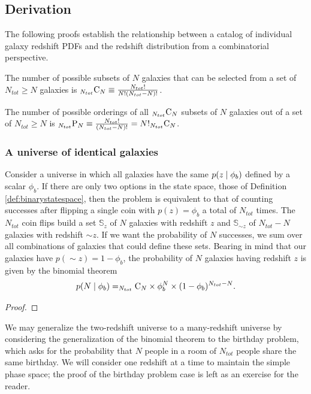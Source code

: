 \subsection{Derivation}
\label{sec:pedanticmath}

The following proofs establish the relationship between a catalog of individual galaxy redshift PDFs and the redshift distribution from a combinatorial perspective.
\begin{definition}
	 The number of possible subsets of $N$ galaxies that can be selected from a set of $N_{tot} \geq N$ galaxies is $_{N_{tot}}\mathrm{C}_{N} \equiv \frac{N_{tot}!}{N! (N_{tot} - N)!}$.
\end{definition}
\begin{definition}
	The number of possible orderings of all $_{N_{tot}}\mathrm{C}_{N}$ subsets of $N$ galaxies out of a set of $N_{tot} \geq N$ is $_{N_{tot}}\mathrm{P}_{N} \equiv \frac{N_{tot}!}{(N_{tot}-N)!} = N!_{N_{tot}}\mathrm{C}_{N}$.
\end{definition}

\subsubsection{A universe of identical galaxies}

\begin{theorem}
Consider a universe in which all galaxies have the same \pzpdf $p(z \mid \phi_{b})$ defined by a scalar $\phi_{b}$.
If there are only two options in the state space, those of Definition \ref{def:binarystatespace}, then the problem is equivalent to that of counting successes after flipping a single coin with $p(z) = \phi_{b}$ a total of $N_{tot}$ times.
The $N_{tot}$ coin flips build a set $\mathbb{S}_{z}$ of $N$ galaxies with redshift $z$ and $\mathbb{S}_{\sim z}$ of $N_{tot} - N$ galaxies with redshift $\sim z$.
If we want the probability of $N$ successes, we sum over all combinations of galaxies that could define these sets.
Bearing in mind that our galaxies have $p(\sim z) = 1 - \phi_{b}$, the probability of $N$ galaxies having redshift $z$ is given by the binomial theorem
\begin{equation}
\eqlabel{eq:binomial}
p(N \gvn \phi_{b}) = \comb{N_{tot}}{N} \times \phi_{b}^{N} \times (1 - \phi_{b})^{N_{tot} - N} .
\end{equation}
\end{theorem}

\begin{proof}
\end{proof}
We may generalize the two-redshift universe to a many-redshift universe by considering the generalization of the binomial theorem to the birthday problem, which asks for the probability that $N$ people in a room of $N_{tot}$ people share the same birthday.
We will consider one redshift at a time to maintain the simple phase space; the proof of the birthday problem case is left as an exercise for the reader.


